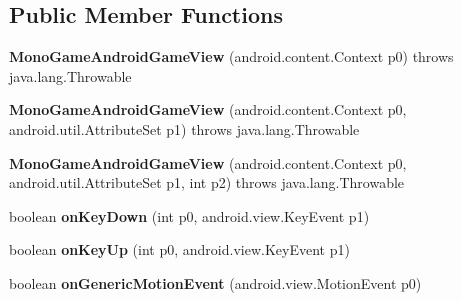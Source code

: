 \subsection*{Public Member Functions}
\begin{DoxyCompactItemize}
\item 
\mbox{\label{classmd59e336b20c5f59a4196ec0611a339f132_1_1MonoGameAndroidGameView_abb6b191cb9cf39c2ca53c62bb1ca3a3b}} 
{\bfseries Mono\+Game\+Android\+Game\+View} (android.\+content.\+Context p0)  throws java.\+lang.\+Throwable 	
\item 
\mbox{\label{classmd59e336b20c5f59a4196ec0611a339f132_1_1MonoGameAndroidGameView_ace3a92d56b266922c5562e6e3e7fe94b}} 
{\bfseries Mono\+Game\+Android\+Game\+View} (android.\+content.\+Context p0, android.\+util.\+Attribute\+Set p1)  throws java.\+lang.\+Throwable 	
\item 
\mbox{\label{classmd59e336b20c5f59a4196ec0611a339f132_1_1MonoGameAndroidGameView_a18ee94338570a13c77009948b92071af}} 
{\bfseries Mono\+Game\+Android\+Game\+View} (android.\+content.\+Context p0, android.\+util.\+Attribute\+Set p1, int p2)  throws java.\+lang.\+Throwable 	
\item 
\mbox{\label{classmd59e336b20c5f59a4196ec0611a339f132_1_1MonoGameAndroidGameView_a672949f307424e2f38ea36f25045a96f}} 
boolean {\bfseries on\+Key\+Down} (int p0, android.\+view.\+Key\+Event p1)
\item 
\mbox{\label{classmd59e336b20c5f59a4196ec0611a339f132_1_1MonoGameAndroidGameView_a7ad5008a7e6b3dfd126d3955f3da1b73}} 
boolean {\bfseries on\+Key\+Up} (int p0, android.\+view.\+Key\+Event p1)
\item 
\mbox{\label{classmd59e336b20c5f59a4196ec0611a339f132_1_1MonoGameAndroidGameView_a494c0d1e31f1d6eb6c99ca566fc37adc}} 
boolean {\bfseries on\+Generic\+Motion\+Event} (android.\+view.\+Motion\+Event p0)
\item 

\end{DoxyCompactItemize}
